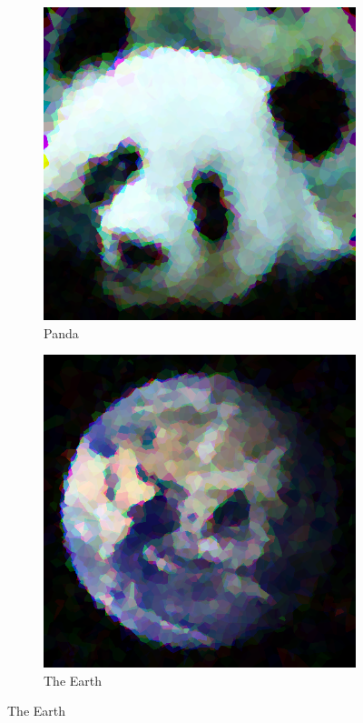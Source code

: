 \documentclass{article}
\begin{document}
\begin{figure}[ht]
   	 \centering
     \begin{subfigure}[b]{0.45\textwidth}
         \centering
         \includegraphics[width=\textwidth]{latex_src/voronoi24.png}
         \caption{Panda}
     \end{subfigure}
     \hfill
     \begin{subfigure}[b]{0.45\textwidth}
         \centering
         \includegraphics[width=\textwidth]{latex_src/voronoi26.png}
         \caption{The Earth}
     \end{subfigure}
\end{figure}
\end{document}
